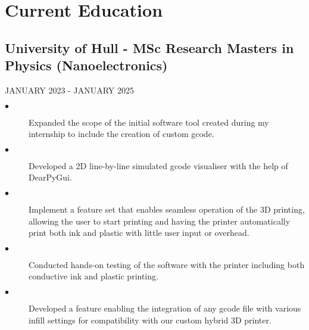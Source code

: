 \documentclass{article}
\begin{document}
\section{Current Education}
\noindent
\begin{minipage}[t]{1\textwidth}
    \subsection{University of Hull \textnormal{- MSc Research Masters in Physics (Nanoelectronics)}}
    \footnotesize{JANUARY 2023 - JANUARY 2025}
    \normalsize{}
    \begin{description}
        \item[$\bullet$]Expanded the scope of the initial software tool created during my internship to include the creation of custom gcode. 
        \item[$\bullet$]Developed a 2D line-by-line simulated gcode visualiser with the help of DearPyGui.
        \item[$\bullet$]Implement a feature set that enables seamless operation of the 3D printing, allowing the user to start printing and having the printer automatically print both ink and plastic with little user input or overhead.
        \item[$\bullet$]Conducted hands-on testing of the software with the printer including both conductive ink and plastic printing.
        \item[$\bullet$]Developed a feature enabling the integration of any gcode file with various infill settings for compatibility with our custom hybrid 3D printer. 
    \end{description}
\end{minipage}
\end{document}
